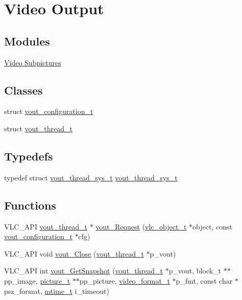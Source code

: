 \hypertarget{group__video__output}{}\section{Video Output}
\label{group__video__output}
\subsection*{Modules}
\begin{DoxyCompactItemize}
\item 
\hyperlink{group__subpicture}{Video Subpictures}
\end{DoxyCompactItemize}
\subsection*{Classes}
\begin{DoxyCompactItemize}
\item 
struct \hyperlink{structvout__configuration__t}{vout\+\_\+configuration\+\_\+t}
\item 
struct \hyperlink{structvout__thread__t}{vout\+\_\+thread\+\_\+t}
\end{DoxyCompactItemize}
\subsection*{Typedefs}
\begin{DoxyCompactItemize}
\item 
typedef struct \hyperlink{group__video__output_ga88d1c41dc17e170ca31480d77bb7a924}{vout\+\_\+thread\+\_\+sys\+\_\+t} \hyperlink{group__video__output_ga88d1c41dc17e170ca31480d77bb7a924}{vout\+\_\+thread\+\_\+sys\+\_\+t}
\end{DoxyCompactItemize}
\subsection*{Functions}
\begin{DoxyCompactItemize}
\item 
V\+L\+C\+\_\+\+A\+PI \hyperlink{structvout__thread__t}{vout\+\_\+thread\+\_\+t} $\ast$ \hyperlink{group__video__output_ga4c225701bb02847e303ab12bd7740394}{vout\+\_\+\+Request} (\hyperlink{structvlc__object__t}{vlc\+\_\+object\+\_\+t} $\ast$object, const \hyperlink{structvout__configuration__t}{vout\+\_\+configuration\+\_\+t} $\ast$cfg)
\item 
V\+L\+C\+\_\+\+A\+PI void \hyperlink{group__video__output_gac4265e793646e4730afe6ce9495205ae}{vout\+\_\+\+Close} (\hyperlink{structvout__thread__t}{vout\+\_\+thread\+\_\+t} $\ast$p\+\_\+vout)
\item 
V\+L\+C\+\_\+\+A\+PI int \hyperlink{group__video__output_gaf9bf2ff7f4467dd658cb0469b5c0b5ed}{vout\+\_\+\+Get\+Snapshot} (\hyperlink{structvout__thread__t}{vout\+\_\+thread\+\_\+t} $\ast$p\+\_\+vout, block\+\_\+t $\ast$$\ast$pp\+\_\+image, \hyperlink{structpicture__t}{picture\+\_\+t} $\ast$$\ast$pp\+\_\+picture, \hyperlink{structvideo__format__t}{video\+\_\+format\+\_\+t} $\ast$p\+\_\+fmt, const char $\ast$psz\+\_\+format, \hyperlink{vlc__common_8h_a996e47c5ea061215703c26738351279e}{mtime\+\_\+t} i\+\_\+timeout)
\end{DoxyCompactItemize}


